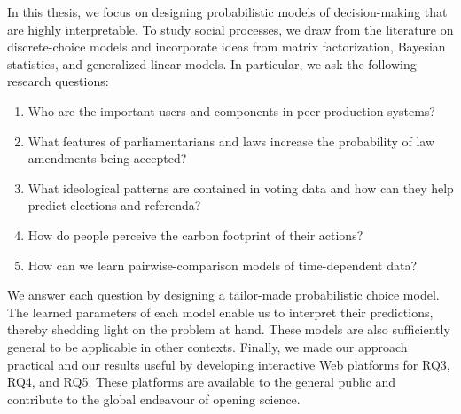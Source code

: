 In this thesis, we focus on designing probabilistic models of decision-making that are highly interpretable.
To study social processes, we draw from the literature on discrete-choice models and incorporate ideas from matrix factorization, Bayesian statistics, and generalized linear models.
In particular, we ask the following research questions:
\begin{enumerate}[
		leftmargin=1.5cm,
		topsep=0cm,
		parsep=0.0pt,
		itemsep=1.5pt,
		label=\textbf{RQ\arabic*}
	]
	\item Who are the important users and components in peer-production systems?
	\item What features of parliamentarians and laws increase the probability of law amendments being accepted?
	\item What ideological patterns are contained in voting data and how can they help predict elections and referenda?
	\item How do people perceive the carbon footprint of their actions?
	\item How can we learn pairwise-comparison models of time-dependent data?
\end{enumerate}
We answer each question by designing a tailor-made probabilistic choice model.
The learned parameters of each model enable us to interpret their predictions, thereby shedding light on the problem at hand.
These models are also sufficiently general to be applicable in other contexts.
Finally, we made our approach practical and our results useful by developing interactive Web platforms for RQ3, RQ4, and RQ5.
These platforms are available to the general public and contribute to the global endeavour of opening science.
